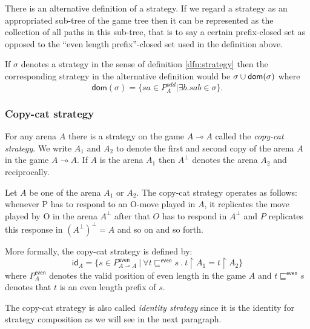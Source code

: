 \begin{rem}
\label{rem:atlern_strategy}
There is an alternative definition of a strategy.
If we regard a strategy as an appropriated sub-tree of the game tree then
it can be represented as the collection of all paths in this sub-tree, that is to say a certain prefix-closed set
as opposed to the ``even length prefix''-closed set used in the definition above.

If $\sigma$ denotes a strategy in the sense of definition \ref{dfn:strategy} then the corresponding strategy in the alternative definition would be
$\sigma \cup \textsf{dom}(\sigma)$ where
$$\textsf{dom}(\sigma) = \{ sa \in P_A^{odd} | \exists b . sab \in \sigma \}.$$
\end{rem}


\subsubsection{Copy-cat strategy}

For any arena $A$ there is a strategy on the game $A \multimap A$
called the \emph{copy-cat strategy}. We write $A_1$ and $A_2$ to
denote the first and second copy of the arena $A$ in the game $A
\multimap A$. If $A$ is the arena $A_1$ then $A^\perp$ denotes the
arena $A_2$ and reciprocally.

Let $A$ be one of the arena $A_1$ or $A_2$. The copy-cat strategy
operates as follows: whenever P has to respond to an O-move played
in $A$, it replicates the move played by O in the arena $A^{\perp}$
after that $O$ has to respond in $A^{\perp}$ and $P$ replicates this
response in $(A^\perp)^\perp = A$ and so on and so forth.


More formally, the copy-cat strategy is defined by:
$$ \textsf{id}_A = \{ s \in P^{\textsf{even}}_{A \multimap A} \ | \ \forall t \sqsubseteq^{\textsf{even}} s\ .\ t \upharpoonright A_1 = t \upharpoonright A_2 \}$$
where $P^{\textsf{even}}_A$ denotes the valid position of even
length in the game $A$ and $t \sqsubseteq^{\textsf{even}} s$ denotes
that $t$ is an even length prefix of $s$.

The copy-cat strategy is also called \emph{identity strategy} since
it is the identity for strategy composition as we will see in the
next paragraph.

